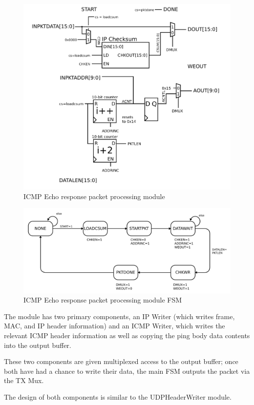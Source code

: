 \begin{figure}
\begin{centering}
\includegraphics[scale=0.8]{ping.icmp.svg}
\end{centering}
\caption{ICMP Echo response packet processing module}
\label{ping}
\end{figure}

\begin{figure}
\begin{centering}
\includegraphics[scale=0.8]{ping.icmp.fsm.svg}
\end{centering}
\caption{ICMP Echo response packet processing module FSM}
\label{ping.fsm}
\end{figure}


The module has two primary components, an IP Writer (which writes
frame, MAC, and IP header information) and an ICMP Writer, which
writes the relevant ICMP header information as well as copying the
ping body data contents into the output buffer.

These two components are given multiplexed access to the output
buffer; once both have had a chance to write their data, the main FSM
outputs the packet via the TX Mux.

The design of both components is similar to the UDPHeaderWriter module. 


